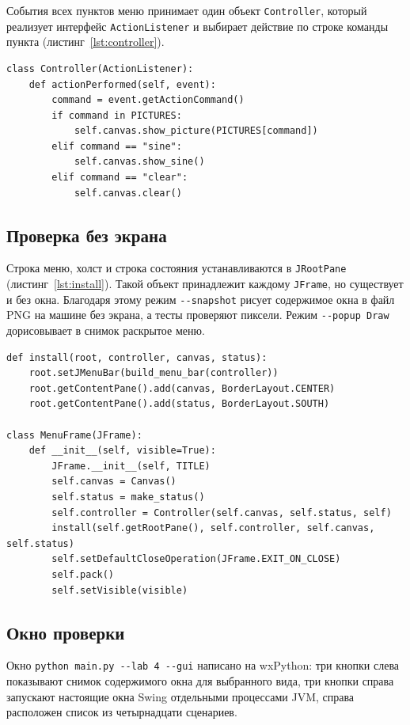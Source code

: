 \documentclass[14pt,a4paper]{extarticle}
\begin{document}
События всех пунктов меню принимает один объект \texttt{Controller}, который
реализует интерфейс \texttt{ActionListener} и выбирает действие по строке команды
пункта (листинг~\ref{lst:controller}).

\begin{lstlisting}[style=python, caption={Обработка выбора пункта меню}, label={lst:controller}]
class Controller(ActionListener):
    def actionPerformed(self, event):
        command = event.getActionCommand()
        if command in PICTURES:
            self.canvas.show_picture(PICTURES[command])
        elif command == "sine":
            self.canvas.show_sine()
        elif command == "clear":
            self.canvas.clear()
\end{lstlisting}

\subsection{Проверка без экрана}

Строка меню, холст и строка состояния устанавливаются в \texttt{JRootPane}
(листинг~\ref{lst:install}). Такой объект принадлежит каждому \texttt{JFrame}, но
существует и без окна. Благодаря этому режим \texttt{-{}-snapshot} рисует содержимое
окна в файл PNG на машине без экрана, а тесты проверяют пиксели. Режим
\texttt{-{}-popup Draw} дорисовывает в снимок раскрытое меню.

\begin{lstlisting}[style=python, caption={Сборка окна}, label={lst:install}]
def install(root, controller, canvas, status):
    root.setJMenuBar(build_menu_bar(controller))
    root.getContentPane().add(canvas, BorderLayout.CENTER)
    root.getContentPane().add(status, BorderLayout.SOUTH)

class MenuFrame(JFrame):
    def __init__(self, visible=True):
        JFrame.__init__(self, TITLE)
        self.canvas = Canvas()
        self.status = make_status()
        self.controller = Controller(self.canvas, self.status, self)
        install(self.getRootPane(), self.controller, self.canvas, self.status)
        self.setDefaultCloseOperation(JFrame.EXIT_ON_CLOSE)
        self.pack()
        self.setVisible(visible)
\end{lstlisting}

\subsection{Окно проверки}

Окно \texttt{python main.py -{}-lab 4 -{}-gui} написано на wxPython: три кнопки слева
показывают снимок содержимого окна для выбранного вида, три кнопки справа запускают
настоящие окна Swing отдельными процессами JVM, справа расположен список из четырнадцати
сценариев.
\end{document}
